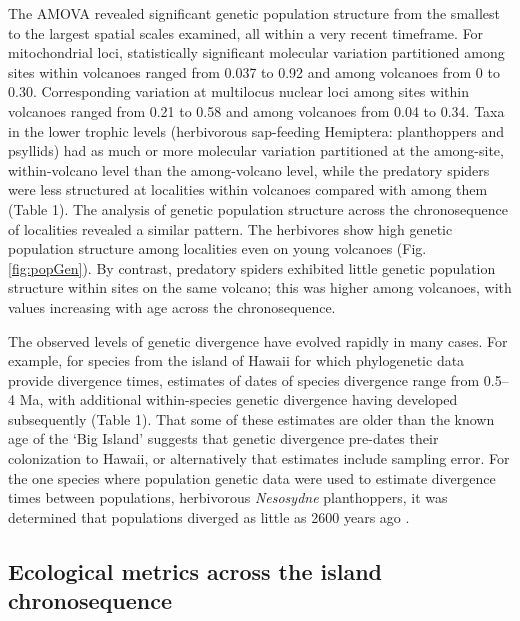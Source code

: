 The AMOVA revealed significant genetic population structure from the
smallest to the largest spatial scales examined, all within a very
recent timeframe. For mitochondrial loci, statistically significant
molecular variation partitioned among sites within volcanoes ranged
from 0.037 to 0.92 and among volcanoes from 0 to 0.30. Corresponding
variation at multilocus nuclear loci among sites within volcanoes
ranged from 0.21 to 0.58 and among volcanoes from 0.04 to 0.34. Taxa
in the lower trophic levels (herbivorous sap-feeding Hemiptera:
planthoppers and psyllids) had as much or more molecular variation
partitioned at the among-site, within-volcano level than the
among-volcano level, while the predatory spiders were less structured
at localities within volcanoes compared with among them (Table 1). The
analysis of genetic population structure across the chronosequence of
localities revealed a similar pattern. The herbivores show high
genetic population structure among localities even on young volcanoes
(Fig. \ref{fig:popGen}). By contrast, predatory spiders exhibited
little genetic population structure within sites on the same volcano;
this was higher among volcanoes, with values increasing with age
across the chronosequence.

The observed levels of genetic divergence have evolved rapidly in many
cases. For example, for species from the island of Hawaii for which
phylogenetic data provide divergence times, estimates of dates of
species divergence range from 0.5--4 Ma, with additional
within-species genetic divergence having developed subsequently (Table
1). That some of these estimates are older than the known age of the
‘Big Island’ suggests that genetic divergence pre-dates their
colonization to Hawaii, or alternatively that estimates include
sampling error. For the one species where population genetic data were
used to estimate divergence times between populations, herbivorous
\textit{Nesosydne} planthoppers, it was determined that populations
diverged as little as 2600 years ago \citep[][Table 1]{goodman2012}.


\subsection{Ecological metrics across the island chronosequence}

